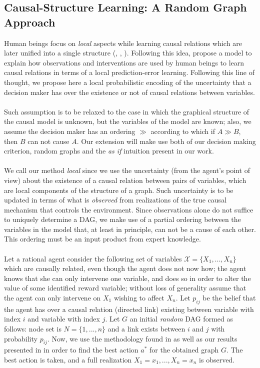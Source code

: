 \documentclass[english,letterpaper,12pt,final]{article}
\theoremstyle{definition}
\begin{document}
\subsection{Causal-Structure Learning: A Random Graph Approach}{\label{random_graph}}
Human beings focus on \textit{local} aspects while learning causal relations which are later unified into a single structure (\cite{fernbach2009causal}, \cite{waldmann2008causal},  \cite{danks2014unifying}). Following this idea, \cite{wellen2012learning} propose a model to explain how observations  and interventions are used by human beings to learn causal relations in terms of a local prediction-error learning. Following this line of thought, we propose here a local probabilistic encoding of the uncertainty that a decision maker has over the existence or not of causal relations between variables.\\
\\
Such assumption is to be relaxed to the case in which the graphical structure of the causal model is unknown, but the variables of the model are known; also, we assume the decision maker has an ordering $\gg$ according to which if $A \gg B$, then $B$ can not cause $A$. Our extension will make use both of our decision making criterion, random graphs and the \textit{as if} intuition present in our work.\\
\\
We call our method \textit{local} since we use the uncertainty (from the agent's point of view) about the existence of a causal relation between pairs of variables, which are local components of the structure of a graph. Such uncertainty is to be updated in terms of what is \textit{observed} from realizations of the true causal mechanism that controls the environment. Since observations alone do not suffice to uniquely determine a DAG, we make use of a partial ordering between the variables in the model that, at least in principle, can not be a cause of each other. This ordering must be an input product from expert knowledge.\\
\\
Let a rational agent consider the following set of variables $\mathcal{X}=\{ X_1,...,X_n \}$ which are causally related, even though the agent does not now how; the agent knows that she can only intervene one variable, and does so in order to alter the value of some  identified reward variable; without loss of generality assume that the agent can only intervene on $X_1$ wishing to affect $X_n$. Let $p_{ij}$ be the belief that the agent has over a causal relation (directed link) existing between variable with index $i$ and variable with index $j$. Let $G$ an initial {\em random} DAG formed as follows: node set is $N=\{1,...,n\}$ and a link exists between $i$ and $j$ with probability $p_{ij}$. Now, we use the methodology found in \cite{gonzalez2018playing}  as well as our results presented in \cite{gonzalez2019theorems} in order to find the best action $a^\ast$ for the obtained graph $G$. The best action is taken, and a full realization $X_1=x_1,...,X_n=x_n$ is observed.\\
\end{document}
